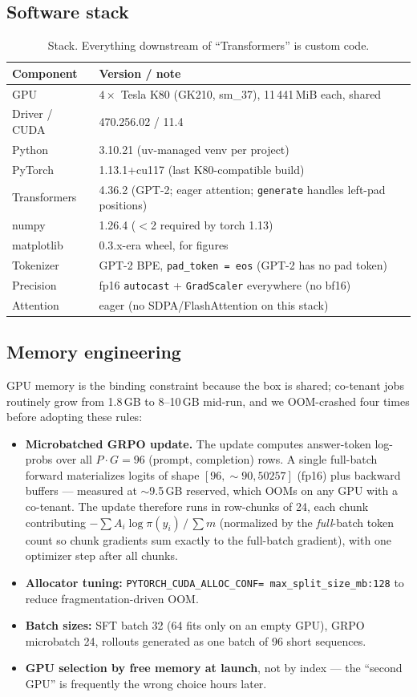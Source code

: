 \documentclass[11pt]{article}
\begin{document}
\subsection{Software stack}
\begin{table}[H]
\centering
\small
\begin{tabular}{ll}
\toprule
Component & Version / note \\
\midrule
GPU & $4\times$ Tesla K80 (GK210, sm\_37), 11\,441\,MiB each, shared \\
Driver / CUDA & 470.256.02 / 11.4 \\
Python & 3.10.21 (uv-managed venv per project) \\
PyTorch & 1.13.1+cu117 (last K80-compatible build) \\
Transformers & 4.36.2 (GPT-2; eager attention; \texttt{generate} handles left-pad positions) \\
numpy & 1.26.4 ($<$2 required by torch 1.13) \\
matplotlib & 0.3.x-era wheel, for figures \\
Tokenizer & GPT-2 BPE, \texttt{pad\_token = eos} (GPT-2 has no pad token) \\
Precision & fp16 \texttt{autocast} + \texttt{GradScaler} everywhere (no bf16) \\
Attention & eager (no SDPA/FlashAttention on this stack) \\
\bottomrule
\end{tabular}
\caption{Stack. Everything downstream of ``Transformers'' is custom code.}
\end{table}

\subsection{Memory engineering}
GPU memory is the binding constraint because the box is shared; co-tenant
jobs routinely grow from 1.8\,GB to 8--10\,GB mid-run, and we OOM-crashed four
times before adopting these rules:
\begin{itemize}
\item \textbf{Microbatched GRPO update.} The update computes answer-token
log-probs over all $P\cdot G = 96$ (prompt, completion) rows. A single
full-batch forward materializes logits of shape
$[96, \sim 90, 50257]$ (fp16) plus backward buffers --- measured at
$\sim$9.5\,GB reserved, which OOMs on any GPU with a co-tenant. The update
therefore runs in row-chunks of 24, each chunk contributing
$-\sum A_i \log \pi(y_i) \,/\, \sum m$ (normalized by the \emph{full}-batch
token count so chunk gradients sum exactly to the full-batch gradient), with
one optimizer step after all chunks.
\item \textbf{Allocator tuning:} \texttt{PYTORCH\_CUDA\_ALLOC\_CONF=
max\_split\_size\_mb:128} to reduce fragmentation-driven OOM.
\item \textbf{Batch sizes:} SFT batch 32 (64 fits only on an empty GPU),
GRPO microbatch 24, rollouts generated as one batch of 96 short sequences.
\item \textbf{GPU selection by free memory at launch}, not by index --- the
``second GPU'' is frequently the wrong choice hours later.
\end{itemize}
\end{document}
